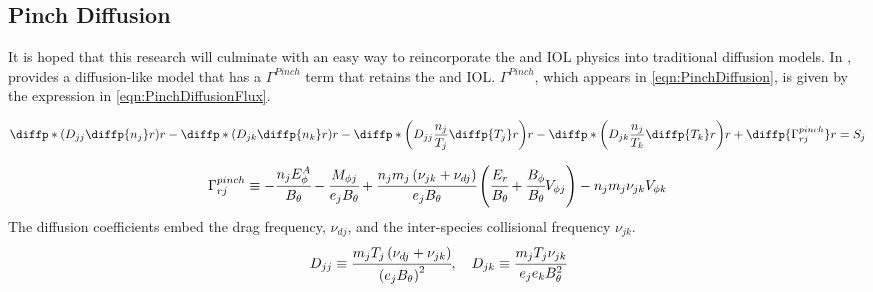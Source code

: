 \subsection{Pinch Diffusion} \label{sub:PinchDiffusion}

It is hoped that this research will culminate with an easy way to reincorporate the \vxb and \ac{IOL} physics into traditional diffusion models. In \cite{Stacey2019}, \citeauthor{Stacey2019} provides a diffusion-like model that has a $\Gamma^{Pinch}$ term that retains the \vxb and \ac{IOL}. $\Gamma^{Pinch}$, which appears in \cref{eqn:PinchDiffusion}, is given by the expression in \cref{eqn:PinchDiffusionFlux}.

\begin{equation}
	\diffp*{\left( D_{jj} \diffp{n_j}r \right)  }r - \diffp*{\left( D_{jk} \diffp{n_k}r \right)  }r - \diffp*{\left( D_{jj} \frac{n_j}{T_j}\diffp{T_j}r \right)  }r -\diffp*{\left( D_{jk} \frac{n_j}{T_k}\diffp{T_k}r \right)  }r + \diffp{\Gamma_{rj}^{pinch}}r = S_j
	\label{eqn:PinchDiffusion}
\end{equation}

\begin{equation}
	\Gamma_{rj}^{pinch} \equiv - \cfrac{n_j E_\phi^A}{B_\theta} - \cfrac{M_{\phi j}}{e_j B_\theta} + 
	\cfrac{n_j m_j \left( \nu_{jk} + \nu_{dj} \right) }{e_j B_\theta} 
	\left( \cfrac{E_r}{B_\theta} + \cfrac{B_\phi}{B_\theta} V_{\phi j} \right)
	- n_j m_j \nu_{jk} V_{\phi k}	
	\label{eqn:PinchDiffusionFlux}
\end{equation}
%
The diffusion coefficients embed the drag frequency, $\nu_{dj}$, and the inter-species collisional frequency $\nu_{jk}$.
%
\begin{equation}
		D_{jj} \equiv \cfrac{m_j T_j \left( \nu_{dj} + \nu_{jk} \right) }{\left(  e_j B_\theta \right)^2}, \quad
		D_{jk} \equiv \cfrac{m_j T_j \nu_{jk} }{ e_j e_k B_\theta^2}
		\label{eqn:PinchDiffusionCoefficients}
\end{equation}
